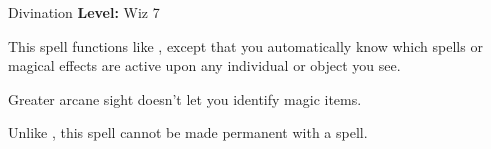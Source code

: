 {Divination}
{
	\textbf{Level:}
	Wiz 7\\
}
{
	This spell functions like , except that you automatically know which spells or magical effects are active upon any individual or object you see.

	Greater arcane sight doesn't let you identify magic items.

	Unlike , this spell cannot be made permanent with a  spell.

}
